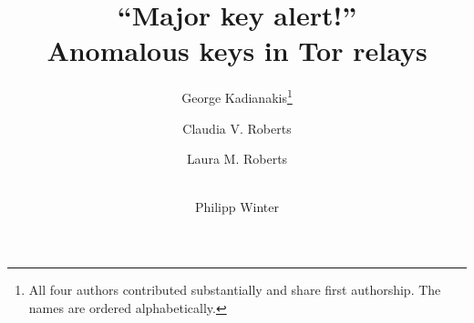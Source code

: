 \documentclass{llncs}
\begin{document}
\title{``Major key alert!''\\Anomalous keys in Tor relays}

\author{
	George Kadianakis\thanks{All four authors contributed substantially
	and share first authorship. The names are ordered alphabetically.} \and
	Claudia V. Roberts \and
	Laura M. Roberts \and \\
	Philipp Winter
}



\pagestyle{headings}  %

\maketitle




















{}

\newpage


\end{document}
